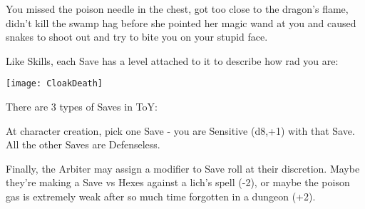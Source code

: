 {  You missed the poison needle in the chest, got too close to the dragon's flame, didn't kill the swamp hag before she pointed her magic wand at you and caused snakes to shoot out and try to bite you on your stupid face.

  Like Skills, each Save has a level attached to it to describe how rad you are:




 \cbreak

    \begin{center}
  \texttt{[image: CloakDeath]}
  \end{center}

  There are 3 types of Saves in ToY:


  At character creation, pick one Save - you are Sensitive (d8,+1) with that Save.  All the other Saves are Defenseless.

  Finally, the Arbiter may assign a modifier to Save roll at their discretion.  Maybe they're making a Save vs Hexes against a lich's spell (-2), or maybe the poison gas is extremely weak after so much time forgotten in a dungeon (+2).

} %
